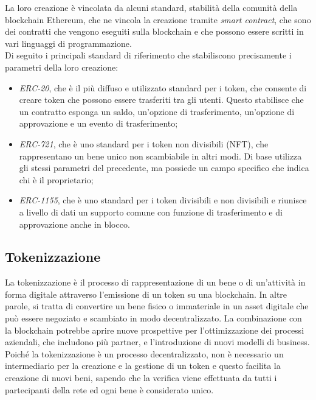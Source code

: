 La loro creazione è vincolata da alcuni standard, stabilità della comunità della blockchain Ethereum, che ne vincola la creazione tramite \textit{smart contract},
che sono dei contratti che vengono eseguiti sulla blockchain e che possono essere scritti in vari linguaggi di programmazione. \\
Di seguito i principali standard di riferimento che stabiliscono precisamente i parametri della loro creazione:
\begin{itemize}
    \item \textit{ERC-20}, che è il più diffuso e utilizzato standard per i token, che consente di creare token che possono essere trasferiti tra gli utenti. 
    Questo stabilisce che un contratto esponga un saldo, un'opzione di trasferimento, un'opzione di approvazione e un evento di trasferimento;
    \item \textit{ERC-721}, che è uno standard per i token non divisibili (NFT), che rappresentano un bene unico non scambiabile in altri modi.
    Di base utilizza gli stessi parametri del precedente, ma possiede un campo specifico che indica chi è il proprietario;
    \item \textit{ERC-1155}, che è uno standard per i token divisibili e non divisibili e riunisce a livello di dati un supporto comune con funzione di trasferimento e di approvazione anche in blocco.
\end{itemize} 

\subsection{Tokenizzazione}\label{sec:tecnologie-blockchain-avanziate-tokenizzazione}
La tokenizzazione è il processo di rappresentazione di un bene o di un'attività in forma digitale attraverso l'emissione di un token su una blockchain. 
In altre parole, si tratta di convertire un bene fisico o immateriale in un asset digitale che può essere negoziato e scambiato in modo decentralizzato.
La combinazione con la blockchain potrebbe aprire nuove prospettive per l'ottimizzazione dei processi aziendali, che includono più partner, e l'introduzione di nuovi modelli di business. 
Poiché la tokenizzazione è un processo decentralizzato, non è necessario un intermediario per la creazione e la gestione di un token e questo facilita la creazione di nuovi beni,
sapendo che la verifica viene effettuata da tutti i partecipanti della rete ed ogni bene è considerato unico. \\

